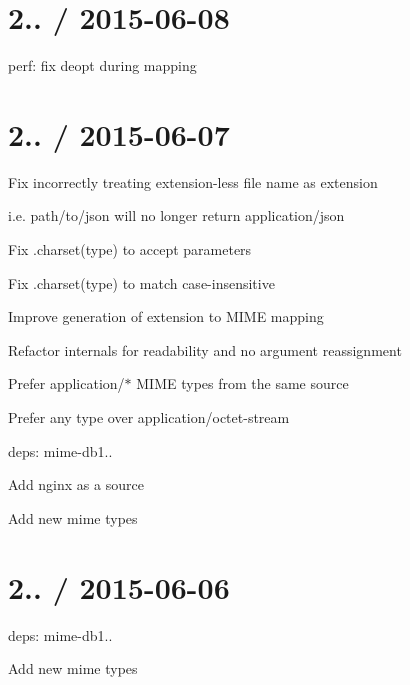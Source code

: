 \section*{2.. / 2015-\/06-\/08 }


\begin{DoxyItemize}
\item perf\+: fix deopt during mapping
\end{DoxyItemize}

\section*{2.. / 2015-\/06-\/07 }


\begin{DoxyItemize}
\item Fix incorrectly treating extension-\/less file name as extension
\begin{DoxyItemize}
\item i.\+e. {\ttfamily \textquotesingle{}path/to/json\textquotesingle{}} will no longer return {\ttfamily application/json}
\end{DoxyItemize}
\item Fix {\ttfamily .charset(type)} to accept parameters
\item Fix {\ttfamily .charset(type)} to match case-\/insensitive
\item Improve generation of extension to M\+I\+ME mapping
\item Refactor internals for readability and no argument reassignment
\item Prefer {\ttfamily application/$\ast$} M\+I\+ME types from the same source
\item Prefer any type over {\ttfamily application/octet-\/stream}
\item deps\+: mime-\/db1..
\begin{DoxyItemize}
\item Add nginx as a source
\item Add new mime types
\end{DoxyItemize}
\end{DoxyItemize}

\section*{2.. / 2015-\/06-\/06 }


\begin{DoxyItemize}
\item deps\+: mime-\/db1..
\begin{DoxyItemize}
\item Add new mime types
\end{DoxyItemize}
\end{DoxyItemize}

